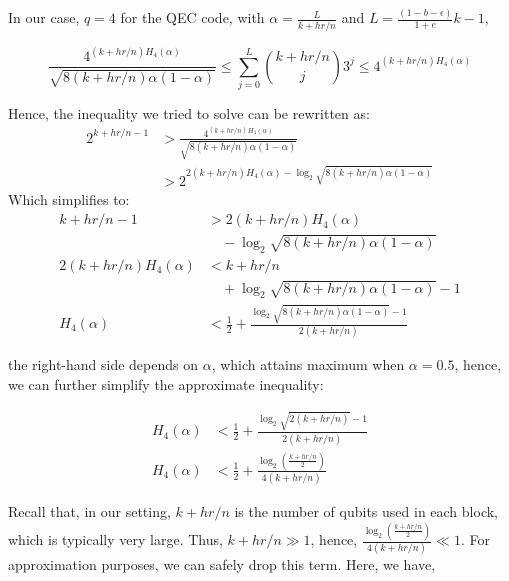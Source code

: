 \documentclass[%
 reprint,
superscriptaddress,
 amsmath,amssymb,
 aps,
]{revtex4-2}
\begin{document}
In our case, $q=4$ for the QEC code, with $\alpha = \frac{L}{k + hr/n}$ and $L=\frac{(1-b-\epsilon)}{1+e}k-1$,

\begin{equation}
    \frac{4^{(k + hr/n) H_4(\alpha)}}{\sqrt{8 (k+hr/n) \alpha(1-\alpha)}}\le\sum_{j=0}^{L} \binom{k + hr/n}{j} 3^j \leq 4^{(k + hr/n) H_4(\alpha)}
\end{equation}

Hence, the inequality we tried to solve can be rewritten as:
\begin{equation}
\begin{split}
    2^{k+hr/n-1}&>\frac{4^{(k + hr/n) H_4(\alpha)}}{\sqrt{8 (k+hr/n) \alpha(1-\alpha)}}\\
    &>2^{2(k + hr/n) H_4(\alpha)-\log_2{\sqrt{8 (k+hr/n) \alpha(1-\alpha)}}}
\end{split}
\end{equation}
Which simplifies to:
\begin{equation}
\begin{split}
    k+hr/n-1&>{2(k + hr/n) H_4(\alpha)} \\ &\quad-\log_2{\sqrt{8 (k+hr/n) \alpha(1-\alpha)}}\\
    2(k+hr/n)H_4(\alpha)&<k+hr/n \\ &\quad+\log_2{\sqrt{8 (k+hr/n) \alpha(1-\alpha)}}-1\\
    H_4(\alpha)&<\frac{1}{2}+\frac{\log_2{\sqrt{8 (k+hr/n) \alpha(1-\alpha)}}-1}{2(k+hr/n)}
\end{split}
\end{equation}

the right-hand side depends on $\alpha$, which attains maximum when $\alpha=0.5$, hence, we can further simplify the approximate inequality:

\begin{equation}
\begin{split}
    H_4(\alpha)&<\frac{1}{2}+\frac{\log_2{\sqrt{2 (k+hr/n)}}-1}{2(k+hr/n)}\\
    H_4(\alpha)&<\frac{1}{2}+\frac{\log_2\left(\frac{k+hr/n}{2}\right)}{4(k+hr/n)}
\end{split}
\end{equation}

Recall that, in our setting, $k+hr/n$ is the number of qubits used in each block, which is typically very large. Thus, $k+hr/n \gg 1$, hence, $\frac{\log_2\left(\frac{k+hr/n}{2}\right)}{4(k+hr/n)}\ll 1$. For approximation purposes, we can safely drop this term. Here, we have,
\end{document}
